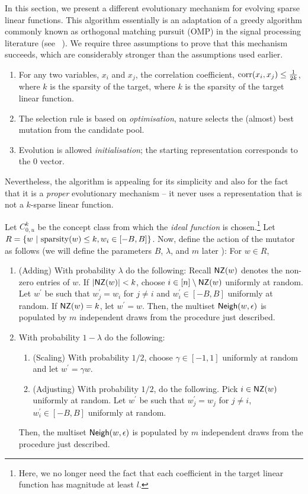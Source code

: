 In this section, we present a different evolutionary mechanism for evolving
sparse linear functions. This algorithm essentially is an adaptation of a greedy
algorithm commonly known as orthogonal matching pursuit (OMP) in the signal
processing literature (see ~\cite{Donoho:2006-recovery, Tropp:2004-greed}). We
require three assumptions to prove that this mechanism succeeds, which are
considerably stronger than the assumptions used earlier.
\begin{enumerate}
%
\item For any two variables, $x_i$ and $x_j$, the correlation coefficient,
$\mathrm{corr}(x_i, x_j) \leq \frac{1}{2k}$, where $k$ is the sparsity of the target,
where $k$ is the sparsity of the target linear function.
%
\item The selection rule is based on \emph{optimisation}, \ie nature selects the
(almost) best mutation from the candidate pool. 
%
\item Evolution is allowed \emph{initialisation}; the starting representation
corresponds to the $0$ vector.
%
\end{enumerate}

Nevertheless, the algorithm is appealing for its simplicity and also for the fact
that it is a \emph{proper} evolutionary mechanism -- it never uses a
representation that is not a $k$-sparse linear function. 

Let $C^k_{0, u}$ be the concept class from which the \emph{ideal function} is
chosen.\footnote{Here, we no longer need the fact that each coefficient in the
target linear function has magnitude at least $l$.} Let $R = \{w ~|~
\mathrm{sparsity}(w) \leq k, w_i \in [-B, B] \}$. Now, define the action of the mutator
as follows (we will define the parameters $B$, $\lambda$, and $m$ later
): For $w \in R$, 
\begin{enumerate}
\item (Adding) With probability $\lambda$ do the following:
Recall $\mathsf{NZ}(w)$ denotes the non-zero entries of $w$. If $|\mathsf{NZ}(w)| < k$, choose
$i \in [n] \setminus \mathsf{NZ}(w)$ uniformly at random. Let $w^\prime$ be such that
$w^\prime_j = w_i$ for $j \neq i$ and $w^\prime_i \in [-B, B]$ uniformly at
random. If $\mathsf{NZ}(w)= k$, let $w^\prime = w$. Then, the multiset $\mathsf{Neigh}(w,
\epsilon)$ is populated by $m$ independent draws from the procedure just
described.
%
\item With probability $1 - \lambda$ do the following:
%
\begin{enumerate}
\item (Scaling) With probability $1/2$, choose $\gamma \in [-1, 1]$ uniformly at
random and let $w^\prime = \gamma w$.
%
\item (Adjusting) With probability $1/2$, do the following.  Pick $i \in \mathsf{NZ}(w)$
uniformly at random.  Let $w^\prime$ be such that $w^\prime_j = w_j$ for $j \neq
i$, $w^\prime_i \in [-B, B]$ uniformly at random.
\end{enumerate}
Then, the multiset $\mathsf{Neigh}(w, \epsilon)$ is populated by $m$ independent draws
from the procedure just described.
\end{enumerate}

